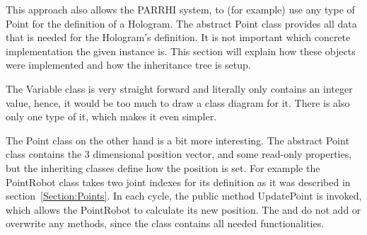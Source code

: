 This approach also allows the PARRHI system, to (for example) use any type of Point for the definition of a Hologram. The abstract Point class provides all data that is needed for the Hologram's definition. It is not important which concrete implementation the given instance is. This section will explain how these objects were implemented and how the inheritance tree is setup.

The Variable class is very straight forward and literally only contains an integer value, hence, it would be too much to draw a class diagram for it. There is also only one type of it, which makes it even simpler. 

The Point class on the other hand is a bit more interesting. The abstract Point class contains the 3 dimensional position vector, and some read-only properties, but the inheriting classes define how the position is set. For example the PointRobot class takes two joint indexes for its definition as it was described in section~\ref{Section:Points}. In each cycle, the public method UpdatePoint is invoked, which allows the PointRobot to calculate its new position. The  and  do not add or overwrite any methods, since the  class contains all needed functionalities.


